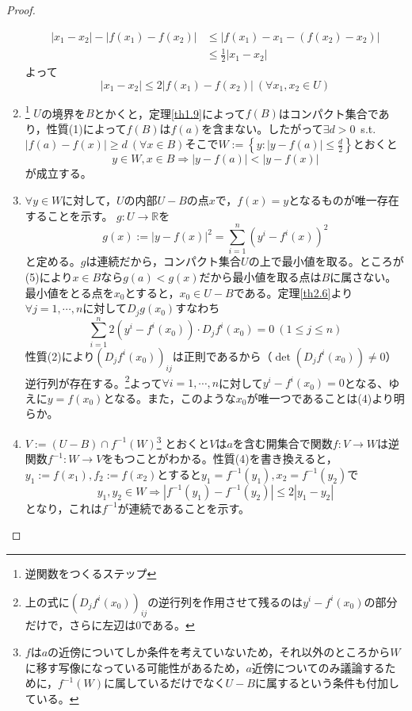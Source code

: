 \begin{proof}
\begin{enumerate}
\[\begin{split}
		|x_1-x_2|-|f(x_1)-f(x_2)|&\leq|f(x_1)-x_1-(f(x_2)-x_2)|\\
		&\leq\frac{1}{2}|x_1-x_2|
	\end{split}
	\]\footnotemark
	よって
	\begin{equation}
		|x_1-x_2|\leq2|f(x_1)-f(x_2)|\ (\forall x_1,x_2\in U)
	\end{equation}
	\item\footnote{逆関数をつくるステップ}
	$U$の境界を$B$とかくと，定理\ref{th1.9}によって$f(B)$はコンパクト集合であり，性質(1)によって$f(B)$は$f(a)$を含まない。したがって$\exists d>0$\ s.t.\ $|f(a)-f(x)|\geq d\ (\forall x\in B)$そこで$\displaystyle W:=\left\{y:|y-f(a)|\leq\frac{d}{2}\right\}$とおくと
	\begin{equation}
		y\in W,x\in B\Rightarrow |y-f(a)|<|y-f(x)|
	\end{equation}
が成立する。

	\item $\forall y\in W$に対して，$U$の内部$U-B$の点$x$で，$f(x)=y$となるものが唯一存在することを示す。
	$g:U\to\mathbb{R}$を
	\[
	g(x):=|y-f(x)|^2=\sum_{i=1}^{n}(y^i-f^i(x))^2
	\]
	と定める。$g$は連続だから，コンパクト集合$U$の上で最小値を取る。ところが(5)により$x\in B$なら$g(a)<g(x)$だから最小値を取る点は$B$に属さない。最小値をとる点を$x_0$とすると，$x_0\in U-B$である。定理\ref{th2.6}より$\forall j=1,\cdots,n$に対して$D_jg(x_0)$すなわち
	\[
	\sum_{i=1}^n 2(y^i-f^i(x_0))\cdot D_jf^i(x_0)=0\ (1\leq j\leq n)
	\]
	性質(2)により$(D_jf^i(x_0))_{ij}$は正則であるから（$\det(D_jf^i(x_0))\neq0$）逆行列が存在する。\footnote{上の式に$(D_jf^i(x_0))_{ij} $の逆行列を作用させて残るのは$y^i-f^i(x_0)$の部分だけで，さらに左辺は0である。}よって$\forall i=1,\cdots,n$に対して$y^i-f^i(x_0)=0$となる、ゆえに$y=f(x_0)$となる。また，このような$x_0$が唯一つであることは(4)より明らか。

	\item $V:=(U-B)\cap f^{-1}(W)$\footnote{$f$は$a$の近傍についてしか条件を考えていないため，それ以外のところから$W$に移す写像になっている可能性があるため，$a$近傍についてのみ議論するために，$f^{-1}(W)$に属しているだけでなく$U-B$に属するという条件も付加している。}
	とおくと$V$は$a$を含む開集合で関数$f:V\to W$は逆関数$f^{-1}:W\to V$をもつことがわかる。性質(4)を書き換えると，$y_1:=f(x_1),f_2:=f(x_2)$とすると$y_1=f^{-1}(y_1),x_2=f^{-1}(y_2)$で
	\begin{equation}
	y_1,y_2\in W\Rightarrow |f^{-1}(y_1)-f^{-1}(y_2)|\leq 2|y_1-y_2|
	\end{equation}
	となり，これは$f^{-1}$が連続であることを示す。


\end{enumerate}
\end{proof}
